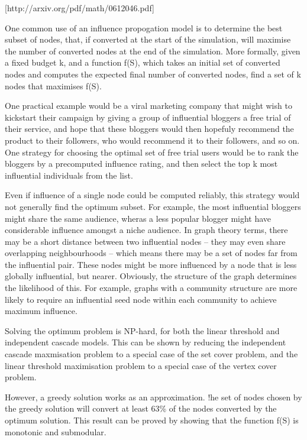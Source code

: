 [http://arxiv.org/pdf/math/0612046.pdf]

One common use of an influence propogation model is to determine the best subset of nodes, that, if converted at the start of the simulation, will maximise the number of converted nodes at the end of the simulation. More formally, given a fixed budget k, and a function f(S), which takes an initial set of converted nodes and computes the expected final number of converted nodes, find a set of k nodes that maximises f(S).

One practical example would be a viral marketing company that might wish to kickstart their campaign by giving a group of influential bloggers a free trial of their service, and hope that these bloggers would then hopefuly recommend the product to their followers, who would recommend it to their followers, and so on. One strategy for choosing the optimal set of free trial users would be to rank the bloggers by a precomputed influence rating, and then select the top k most influential individuals from the list.

Even if influence of a single node could be computed reliably, this strategy would not generally find the optimum subset. For example, the most influential bloggers might share the same audience, wheras a less popular blogger might have considerable influence amongst a niche audience. In graph theory terms, there may be a short distance between two influential nodes -- they may even share overlapping neighbourhoods -- which means there may be a set of nodes far from the influential pair. These nodes might be more influenced by a node that is less globally influential, but nearer. Obviously, the structure of the graph determines the likelihood of this. For example, graphs with a community structure are more likely to require an influential seed node within each community to achieve maximum influence.

Solving the optimum problem is NP-hard, for both the linear threshold and independent cascade models. This can be shown by reducing the independent cascade maxmisation problem to a special case of the set cover problem, and the linear threshold maximisation problem to a special case of the vertex cover problem.

However, a greedy solution works as an approximation. !he set of nodes chosen by the greedy solution will convert at least 63\% of the nodes converted by the optimum solution. This result can be proved by showing that the function f(S) is monotonic and submodular.

